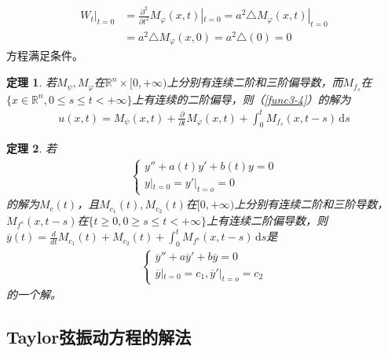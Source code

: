\documentclass[11pt, a4paper]{article}
\theoremstyle{theorem}
\newtheorem{thm}{定理}[section]
\newcommand{\intd}[1]{\,\mathrm{d}{#1}}
\begin{document}
\begin{align*}
W_t|_{t = 0} &= \frac{\partial^2 }{\partial t^2} M_\varphi(x,t) |_{t = 0} = a^2 \triangle M_\varphi(x,t) |_{t = 0} \\
&= a^2 \triangle M_\varphi(x,0) = a^2 \triangle(0) = 0
\end{align*}
方程满足条件。

\begin{thm}
\label{thm3-4}
若$M_\psi, M_\varphi$在$\mathbb{R}^n \times [0, + \infty)$上分别有连续二阶和三阶偏导数，而$M_{f_s}$在$\{x \in \mathbb{R}^n, 0 \leq s \leq t < + \infty\}$上有连续的二阶偏导，则（\ref{func3-4}）的解为
\begin{align}
    u(x,t) = M_\psi(x,t) + \frac{\partial}{\partial t} M_\varphi(x,t) + \int_0^t M_{f_s}(x,t-s) \intd s
\end{align}
\end{thm}

\begin{thm}
若
\begin{align}
    \begin{cases}
    y'' + a(t) y' + b(t) y = 0 \\
    y|_{t = 0} = y'|_{t = o} = 0
    \end{cases}
\end{align}
的解为$M_c(t)$，且$M_{c_1}(t), M_{c_2}(t)$在$[0,+\infty)$上分别有连续二阶和三阶导数，$M_{f^s}(x,t-s)$在$\{t \geq 0, 0 \geq s \leq t < + \infty\}$上有连续二阶偏导数，则$\overline{y}(t) = \frac{d}{d t} M_{c_1}(t) + M_{c_2}(t) + \int_0^t M_{f^s} (x, t-s) \intd s$是
\begin{align}
    \begin{cases}
    \overline{y}'' + a \overline{y}' + b \overline{y} = 0 \\
    \overline{y}|_{t = 0} = c_1, \overline{y}'|_{t = o} = c_2
    \end{cases}
\end{align}
的一个解。
\end{thm}

\subsection{Taylor弦振动方程的解法}
\end{document}
